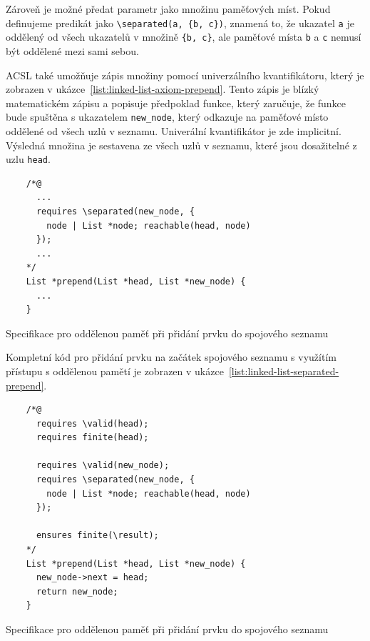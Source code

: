Zároveň je možné předat parametr jako množinu paměťových míst.
Pokud definujeme predikát jako \texttt{\textbackslash separated(a, \{b, c\})},
znamená to, že ukazatel \texttt{a} je oddělený od všech ukazatelů v množině \texttt{\{b, c\}},
ale paměťové místa \texttt{b} a \texttt{c} nemusí být oddělené mezi sami sebou.

ACSL také umožňuje zápis množiny pomocí univerzálního kvantifikátoru,
který je zobrazen v ukázce~\ref{list:linked-list-axiom-prepend}.
Tento zápis je blízký matematickém zápisu a popisuje předpoklad funkce,
který zaručuje, že funkce bude spuštěna s ukazatelem \texttt{new\_node},
který odkazuje na paměťové místo oddělené od všech uzlů v seznamu.
Univerální kvantifikátor je zde implicitní.
Výsledná množina je sestavena ze všech uzlů v seznamu,
které jsou dosažitelné z uzlu \texttt{head}.

\begin{listing}[H]
    \begin{verbatim}
    /*@
      ...
      requires \separated(new_node, {
        node | List *node; reachable(head, node)
      });
      ...
    */
    List *prepend(List *head, List *new_node) {
      ...
    }
    \end{verbatim}
    \caption{Specifikace pro oddělenou paměť při přidání prvku do spojového seznamu}
    \label{list:linked-list-axiom-prepend}
\end{listing}

Kompletní kód pro přidání prvku na začátek spojového seznamu
s využítím přístupu s oddělenou pamětí je zobrazen v ukázce~\ref{list:linked-list-separated-prepend}.

\begin{listing}[H]
    \begin{verbatim}
    /*@
      requires \valid(head);
      requires finite(head);

      requires \valid(new_node);
      requires \separated(new_node, {
        node | List *node; reachable(head, node)
      });

      ensures finite(\result);
    */
    List *prepend(List *head, List *new_node) {
      new_node->next = head;
      return new_node;
    }
    \end{verbatim}
    \caption{Specifikace pro oddělenou paměť při přidání prvku do spojového seznamu}
    \label{list:linked-list-separated-prepend}
\end{listing}

